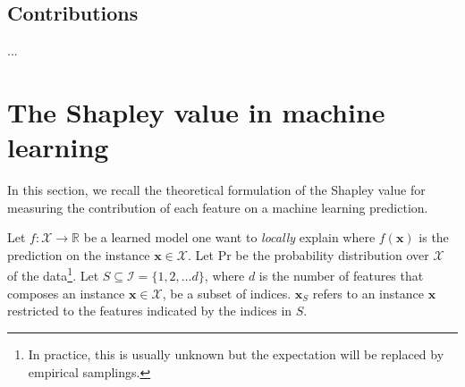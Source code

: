 \documentclass{article}
\theoremstyle{plain}
\theoremstyle{definition}
\theoremstyle{remark}
\begin{document}
\subsection{Contributions}

...

\section{The Shapley value in machine learning}
\label{sec:shapley}

In this section, we recall the theoretical formulation of the Shapley value for measuring the contribution of each feature on a machine learning prediction.

Let $f:\mathcal{X}\to\mathbb{R}$ be a learned model one want to \emph{locally} explain where $f(\bm{x})$ is the prediction on the instance $\bm{x}\in\mathcal{X}$. Let $\text{Pr}$ be the probability distribution over $\mathcal{X}$ of the data\footnote{In practice, this is usually unknown but the expectation will be replaced by empirical samplings.}. Let $S\subseteq \mathcal{I}=\{1,2,\dots d\}$, where $d$ is the number of features that composes an instance $\bm{x}\in\mathcal{X}$, be a subset of indices. $\bm{x}_S$ refers to an instance $\bm{x}$ restricted to the features indicated by the indices in $S$.
\end{document}
